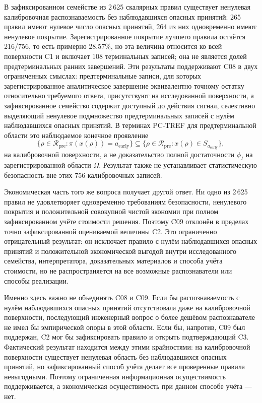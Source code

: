 В зафиксированном семействе из 2\,625 скалярных правил существует ненулевая
калибровочная распознаваемость без наблюдавшихся опасных принятий: 265
правил имеют нулевое число опасных принятий, 264 из них одновременно имеют
ненулевое покрытие. Зарегистрированное покрытие лучшего правила остаётся
216/756, то есть примерно 28.57\%, но эта величина относится ко всей поверхности
C1 и включает 108 терминальных записей; она не является долей предтерминальных
ранних завершений. Эти результаты поддерживают C08 в двух ограниченных смыслах:
предтерминальные записи, для которых зарегистрированное аналитическое завершение
эквивалентно точному остатку относительно требуемого ответа, присутствуют на
исследованной поверхности,
а зафиксированное семейство содержит доступный до действия сигнал, селективно
выделяющий ненулевое подмножество предтерминальных записей с нулём наблюдавшихся опасных
принятий. В терминах PC-TREF для предтерминальной области это наблюдаемое
конечное проявление
\[
  \{\rho\in\mathcal R_{\mathrm{pre}}:\pi(x(\rho))=a_{\mathrm{early}}\}
  \subseteq
  \{\rho\in\mathcal R_{\mathrm{pre}}:x(\rho)\in S_{a_{\mathrm{early}}}\},
\]
на калибровочной поверхности, а не доказательство полной достаточности
$\phi_I$ на зарегистрированной области $\Omega$. Результат
также не устанавливает статистическую безопасность вне этих 756 калибровочных
записей.

Экономическая часть того же вопроса получает другой ответ. Ни одно из
2\,625 правил не удовлетворяет одновременно требованиям безопасности,
ненулевого покрытия и положительной совокупной чистой экономии при полном
зафиксированном учёте стоимости решения. Поэтому C09 отклонён в пределах точно
зафиксированной оцениваемой величины C2. Это ограниченно отрицательный
результат: он исключает правило с нулём наблюдавшихся опасных принятий и положительной экономической выгодой внутри
исследованного семейства, интерпретатора, доказательных материалов и способа
учёта стоимости, но не распространяется на все возможные распознаватели или
способы реализации.

Именно здесь важно не объединять C08 и C09. Если бы распознаваемость с нулём
наблюдавшихся опасных принятий отсутствовала даже на калибровочной поверхности,
последующий инженерный вопрос о более дешёвом распознавателе не имел бы
эмпирической опоры в этой области. Если бы, напротив, C09
был поддержан, C2 мог бы зафиксировать правило и открыть подтверждающий C3.
Фактический результат находится между этими крайностями: на калибровочной
поверхности существует ненулевая область без наблюдавшихся опасных принятий, но
зафиксированный способ учёта делает все проверенные правила невыгодными. Поэтому
ограниченная информационная осуществимость поддерживается, а экономическая
осуществимость при данном способе учёта --- нет.

